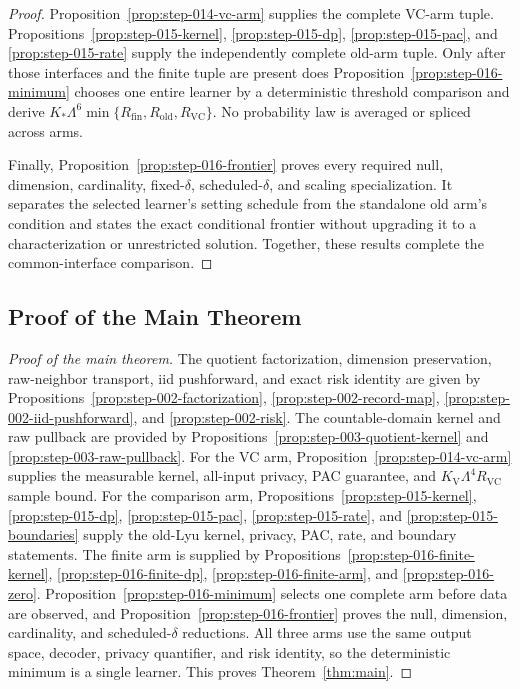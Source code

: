\begin{proof}
Proposition~\ref{prop:step-014-vc-arm} supplies the complete
VC-arm tuple.  Propositions~\ref{prop:step-015-kernel},
\ref{prop:step-015-dp}, \ref{prop:step-015-pac}, and
\ref{prop:step-015-rate} supply the independently complete old-arm tuple.
Only after those interfaces and the finite tuple are present does
Proposition~\ref{prop:step-016-minimum} chooses one entire learner by a
deterministic threshold comparison and derive
\(K_*\Lambda^6\min\{R_{\mathrm{fin}},R_{\mathrm{old}},R_{\mathrm{VC}}\}\).
No probability law is averaged or spliced across arms.

Finally, Proposition~\ref{prop:step-016-frontier} proves every required null,
dimension, cardinality, fixed-\(\delta\), scheduled-\(\delta\), and scaling
specialization. It separates the selected learner's setting schedule from
the standalone old arm's condition and states the exact conditional frontier
without upgrading it to a characterization or unrestricted solution. Together,
these results complete the common-interface comparison.



\end{proof}

\subsection{Proof of the Main Theorem}\label{app:main-proof}

\begin{proof}[Proof of the main theorem]
The quotient factorization, dimension preservation, raw-neighbor transport,
iid pushforward, and exact risk identity are given by
Propositions~\ref{prop:step-002-factorization},
\ref{prop:step-002-record-map},
\ref{prop:step-002-iid-pushforward}, and
\ref{prop:step-002-risk}. The countable-domain kernel and raw pullback are
provided by Propositions~\ref{prop:step-003-quotient-kernel} and
\ref{prop:step-003-raw-pullback}. For the VC arm,
Proposition~\ref{prop:step-014-vc-arm} supplies the measurable kernel,
all-input privacy, PAC guarantee, and
$K_{\mathrm V}\Lambda^4R_{\mathrm{VC}}$ sample bound. For the comparison
arm, Propositions~\ref{prop:step-015-kernel},
\ref{prop:step-015-dp}, \ref{prop:step-015-pac},
\ref{prop:step-015-rate}, and
\ref{prop:step-015-boundaries} supply the old-Lyu kernel, privacy, PAC,
rate, and boundary statements. The finite arm is supplied by
Propositions~\ref{prop:step-016-finite-kernel},
\ref{prop:step-016-finite-dp},
\ref{prop:step-016-finite-arm}, and
\ref{prop:step-016-zero}. Proposition~\ref{prop:step-016-minimum}
selects one complete arm before data are observed, and
Proposition~\ref{prop:step-016-frontier} proves the null, dimension,
cardinality, and scheduled-\(\delta\) reductions. All three arms use the
same output space, decoder, privacy quantifier, and risk identity, so the
deterministic minimum is a single learner. This proves Theorem~\ref{thm:main}.
\end{proof}

